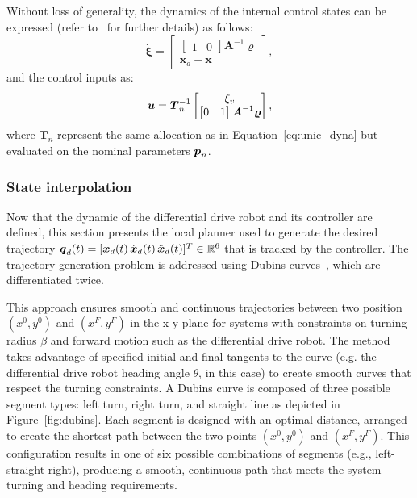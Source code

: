 Without loss of generality, the dynamics of the internal control states can be expressed (refer to~\cite{cDFL} for further details) as follows:
\begin{equation}
  \dot{\boldsymbol{\xi}} = 
  \begin{bmatrix}
    \begin{bmatrix}1 & 0\end{bmatrix}\boldsymbol{A}^{-1}\boldsymbol{\varrho} \\
    \boldsymbol{x}_d - \boldsymbol{x}
  \end{bmatrix}, 
\end{equation}
and the control inputs as:
\begin{equation}
  \boldsymbol{u} = \boldsymbol{T}_n^{-1} 
  \begin{bmatrix}
    \xi_v \\
    \begin{bmatrix}0 & 1\end{bmatrix}\boldsymbol{A}^{-1}\boldsymbol{\varrho}
  \end{bmatrix},
\end{equation}
where $\boldsymbol{T}_n$ represent the same allocation as in Equation~\ref{eq:unic_dyna} but evaluated on the nominal parameters $\boldsymbol{p}_n$.

\subsubsection{State interpolation}

Now that the dynamic of the differential drive robot and its controller are defined, this section presents the local planner used to generate the desired trajectory $\boldsymbol{q}_d(t) = [\boldsymbol{x}_d(t) \, \dot{\boldsymbol{x}}_d(t) \, \ddot{\boldsymbol{x}}_d(t)]^T \in \mathbb{R}^6$ that is tracked by the  controller.
The trajectory generation problem is addressed using Dubins curves~\cite{cDubins}, which are differentiated twice. 

This approach ensures smooth and continuous trajectories between two position $(x^0, y^0)$ and $(x^F, y^F)$ in the x-y plane for systems with constraints on turning radius $\beta$ and forward motion such as the differential drive robot.
The method takes advantage of specified initial and final tangents to the curve (e.g. the differential drive robot heading angle $\theta$, in this case) to create smooth curves that respect the turning constraints.
A Dubins curve is composed of three possible segment types: left turn, right turn, and straight line as depicted in Figure~\ref{fig:dubins}. 
Each segment is designed with an optimal distance, arranged to create the shortest path between the two points $(x^0, y^0)$ and $(x^F, y^F)$. 
This configuration results in one of six possible combinations of segments (e.g., left-straight-right), producing a smooth, continuous path that meets the system turning and heading requirements.

